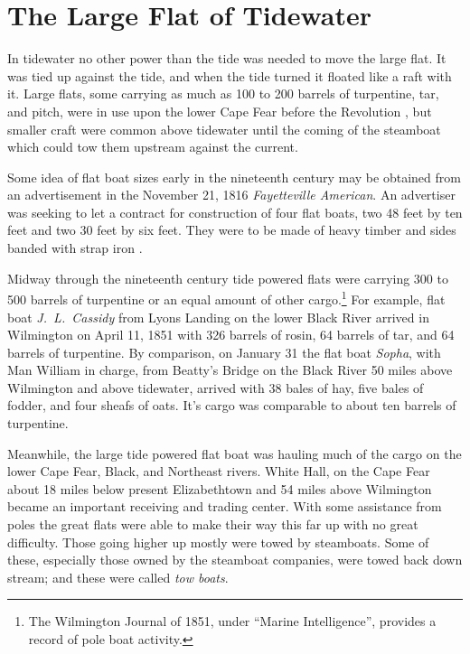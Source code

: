 \documentclass[11pt, a5paper, openright]{book}
\begin{document}
\section{The Large Flat of Tidewater}

In tidewater no other power than the tide was needed to move the large
flat.  It was tied up against the tide, and when the tide turned it
floated like a raft with it.  Large flats, some carrying as much as 100
to 200 barrels of turpentine, tar, and pitch, were in use upon the
lower Cape Fear before the Revolution \citep[184-185]{schawj}, but
smaller craft were common above tidewater until the coming of the
steamboat which could tow them upstream against the current.\par

Some idea of flat boat sizes early in the nineteenth century may be
obtained from an advertisement in the November 21, 1816
\textit{Fayetteville American}.  An advertiser was seeking to let a
contract for construction of four flat boats, two 48 feet by ten feet
and two 30 feet by six feet.  They were to be made of heavy timber and
sides banded with strap iron \citep[11-21-16]{fa}.\par

Midway through the nineteenth century tide powered flats were carrying
300 to 500 barrels of turpentine or an equal amount of other
cargo.\footnote{The Wilmington Journal of 1851, under ``Marine
  Intelligence'', provides a record of pole boat activity.}  For
example, flat boat
\textit{J.~L.~Cassidy} from Lyons
Landing on the lower Black River arrived in Wilmington on April 11,
1851 with 326 barrels of rosin, 64 barrels of tar, and 64 barrels
of turpentine.  By comparison, on January 31 the flat boat
\textit{Sopha}, with Man William in charge, from Beatty's Bridge on
the Black River 50 miles above Wilmington and above tidewater, arrived
with 38 bales of hay, five bales of fodder, and four sheafs of oats.
It's cargo was comparable to about ten barrels of turpentine.\par

Meanwhile, the large tide powered flat boat was hauling much of the
cargo on the lower Cape Fear, Black, and Northeast rivers.  White
Hall, on the Cape Fear about 18 miles below present Elizabethtown and
54 miles above Wilmington became an important receiving and trading
center.  With some assistance from poles the great flats were able to
make their way this far up with no great difficulty.  Those going
higher up mostly were towed by steamboats.  Some of these, especially
those owned by the steamboat companies, were towed back down stream;
and these were called \textit{tow boats}.\par
\end{document}
